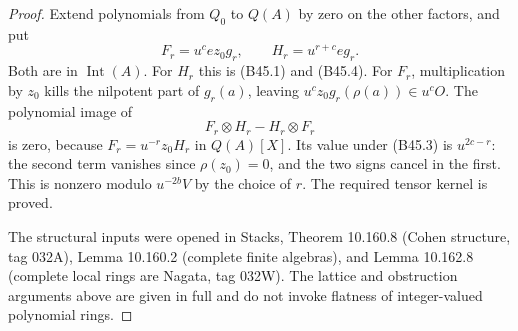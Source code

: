 \begin{proof}
Extend polynomials from $Q_0$ to $Q(A)$ by zero on the
other factors, and put
\[
       F_r=u^c e z_0g_r,\qquad H_r=u^{r+c}eg_r.
\]
Both are in $\operatorname{Int}(A)$. For $H_r$ this is
(B45.1) and (B45.4). For $F_r$, multiplication by $z_0$
kills the nilpotent part of $g_r(a)$, leaving
$u^cz_0g_r(\rho(a))\in u^cO$.
The polynomial image of
\[
                   F_r\otimes H_r-H_r\otimes F_r
\]
is zero, because $F_r=u^{-r}z_0H_r$ in $Q(A)[X]$.
Its value under (B45.3) is $u^{2c-r}$: the second term
vanishes since $\rho(z_0)=0$, and the two signs cancel
in the first. This is nonzero modulo $u^{-2b}V$ by the
choice of $r$. The required tensor kernel is proved.

The structural inputs were opened in Stacks, Theorem 10.160.8
(Cohen structure, tag 032A), Lemma 10.160.2 (complete finite
algebras), and Lemma 10.162.8 (complete local rings are Nagata,
tag 032W). The lattice and obstruction arguments above are
given in full and do not invoke flatness of integer-valued
polynomial rings.
\end{proof}

